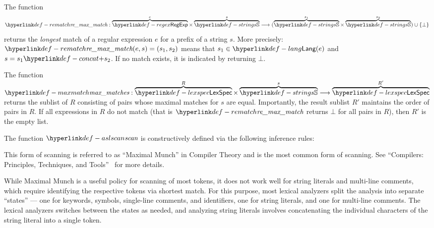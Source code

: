 The function
\[
\remaxmatch : \overname{\RegExp}{e} \times \overname{\Strings}{s} \aslto (\overname{\Strings}{s_1} \times \overname{\Strings}{s_2}) \cup \{\bot\}
\]
returns the \emph{longest} match of a regular expression $e$ for a prefix of a string $s$.
More precisely:
$\remaxmatch(e, s) = (s_1,s_2)$ means that $s_1\in\Lang(e)$ and $s = s_1 \concat s_2$.
If no match exists, it is indicated by returning $\bot$.

The function $\maxmatches : \overname{\LexSpec}{R} \times \overname{\Strings}{s} \aslto \overname{\LexSpec}{R'}$
returns the sublist of $R$ consisting of pairs whose maximal matches for $s$ are equal. Importantly, the result sublist $R'$ maintains
the order of pairs in $R$. If all expressions in $R$ do not match (that is $\remaxmatch$ returns $\bot$ for all pairs in $R$), then $R'$ is the empty list.

The function $\aslscan$ is constructively defined via the following inference rules:

\begin{mathpar}
\end{mathpar}

\begin{mathpar}
\end{mathpar}

This form of scanning is referred to as ``Maximal Munch'' in Compiler Theory
and is the most common form of scanning.
See ``Compilers: Principles, Techniques, and Tools''~\cite{ASU86} for more details.

While Maximal Munch is a useful policy for scanning of most tokens,
it does not work well for string literals and multi-line comments, which require
identifying the respective tokens via shortest match.
%
For this purpose, most lexical analyzers split the analysis into separate ``states'' ---
one for keywords, symbols, single-line comments, and identifiers, one for string literals,
and one for multi-line comments. The lexical analyzers switches between the states as
needed, and analyzing string literals involves concatenating the individual characters
of the string literal into a single token.

